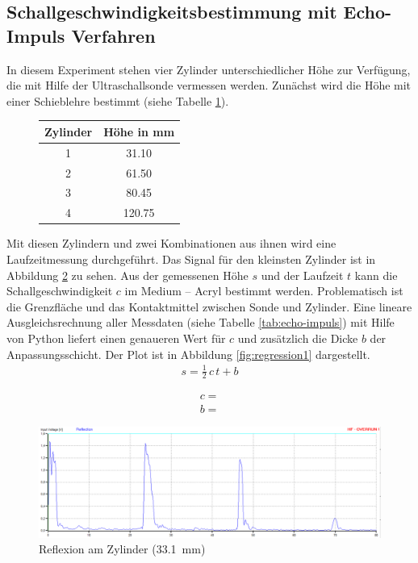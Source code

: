 \subsection{Schallgeschwindigkeitsbestimmung mit Echo-Impuls Verfahren}\label{sec:echo-impuls}
In diesem Experiment stehen vier Zylinder unterschiedlicher Höhe zur Verfügung, die mit Hilfe der Ultraschallsonde vermessen werden. Zunächst wird die Höhe mit einer Schieblehre bestimmt (siehe Tabelle \ref{tab:zylinder}).

 \begin{figure}[h!]
 	\centering
 	\begin{tabular}{c|c}
 	Zylinder & Höhe in mm\\
 		\hline
  1 & 31.10 \\
  2 & 61.50 \\
  3 & 80.45 \\
  4 & 120.75 \\
 	\end{tabular}
 	\label{tab:zylinder}
 \end{figure}
 
 Mit diesen Zylindern und zwei Kombinationen aus ihnen wird eine Laufzeitmessung durchgeführt. Das Signal für den kleinsten Zylinder ist in Abbildung \ref{fig:reflexion1} zu sehen. Aus der gemessenen Höhe $s $ und der Laufzeit $t$ kann die Schallgeschwindigkeit $c$ im Medium -- Acryl bestimmt werden. Problematisch ist die Grenzfläche und das Kontaktmittel zwischen Sonde und Zylinder. Eine lineare Ausgleichsrechnung aller Messdaten (siehe Tabelle \ref{tab:echo-impuls}) mit Hilfe von Python liefert einen genaueren Wert für $c$ und zusätzlich die Dicke $b$ der Anpassungsschicht. Der Plot ist in Abbildung \ref{fig:regression1} dargestellt. 
 \begin{align}
 	s = \frac{1}{2} \, c \, t + b
 \end{align}
 
 \begin{align}
 	c =  \\
 	b = 
 \end{align}

 \begin{figure}[h!]
 	\centering
 	\includegraphics[width=\textwidth]{Messung_1.png}
 	\caption{Reflexion am Zylinder (\SI{33.1}{\milli\meter})}
 	\label{fig:reflexion1}
 \end{figure}


